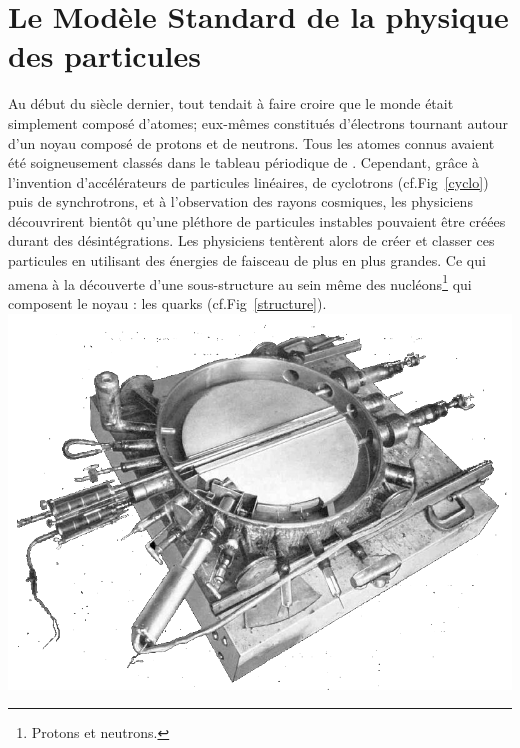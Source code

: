 \section{Le Modèle Standard de la physique des particules}
 
Au début du siècle dernier, tout tendait à faire croire que le monde était simplement composé d'atomes; eux-mêmes constitués d'électrons tournant autour d'un noyau composé de protons et de neutrons. Tous les atomes connus avaient été soigneusement classés dans le tableau périodique de . Cependant, grâce à l'invention d'accélérateurs de particules linéaires, de cyclotrons (cf.Fig~\ref{cyclo}) puis de synchrotrons, et à l'observation des rayons cosmiques, les physiciens découvrirent bientôt qu'une pléthore de particules instables pouvaient être créées durant des désintégrations. Les physiciens tentèrent alors de créer et classer ces particules en utilisant des énergies de faisceau de plus en plus grandes. Ce qui amena à la découverte d'une sous-structure au sein même des nucléons\footnote{Protons et neutrons.} qui composent le noyau : les quarks (cf.Fig~\ref{structure}).
\marginpar
{
	\includegraphics[width=\marginparwidth]{SM/cyclotron.png}
    \label{cyclo}
}

